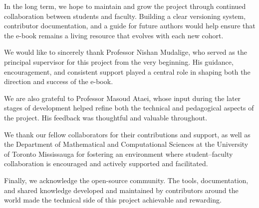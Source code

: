 \documentclass[11pt]{article}
\begin{document}
In the long term, we hope to maintain and grow the project through continued collaboration between students and faculty. Building a clear versioning system, contributor documentation, and a guide for future authors would help ensure that the e-book remains a living resource that evolves with each new cohort.


\begin{acknowledgments}
We would like to sincerely thank Professor Nishan Mudalige, who served as the principal supervisor for this project from the very beginning. His guidance, encouragement, and consistent support played a central role in shaping both the direction and success of the e-book.

We are also grateful to Professor Masoud Ataei, whose input during the later stages of development helped refine both the technical and pedagogical aspects of the project. His feedback was thoughtful and valuable throughout.

We thank our fellow collaborators for their contributions and support, as well as the Department of Mathematical and Computational Sciences at the University of Toronto Mississauga for fostering an environment where student–faculty collaboration is encouraged and actively supported and facilitated.

Finally, we acknowledge the open-source community. The tools, documentation, and shared knowledge developed and maintained by contributors around the world made the technical side of this project achievable and rewarding.
\end{acknowledgments}

\end{document}
